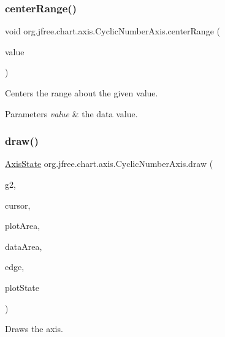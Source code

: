 \subsubsection{\texorpdfstring{center\+Range()}{centerRange()}}
{\footnotesize\ttfamily void org.\+jfree.\+chart.\+axis.\+Cyclic\+Number\+Axis.\+center\+Range (\begin{DoxyParamCaption}\item[{double}]{value }\end{DoxyParamCaption})}

Centers the range about the given value.


\begin{DoxyParams}{Parameters}
{\em value} & the data value. \\
\hline
\end{DoxyParams}
\mbox{\label{classorg_1_1jfree_1_1chart_1_1axis_1_1_cyclic_number_axis_ad760bc36b2877cd2aab98f6ad3d10787}} 
\subsubsection{\texorpdfstring{draw()}{draw()}}
{\footnotesize\ttfamily \mbox{\hyperlink{classorg_1_1jfree_1_1chart_1_1axis_1_1_axis_state}{Axis\+State}} org.\+jfree.\+chart.\+axis.\+Cyclic\+Number\+Axis.\+draw (\begin{DoxyParamCaption}\item[{Graphics2D}]{g2,  }\item[{double}]{cursor,  }\item[{Rectangle2D}]{plot\+Area,  }\item[{Rectangle2D}]{data\+Area,  }\item[{Rectangle\+Edge}]{edge,  }\item[{\mbox{\hyperlink{classorg_1_1jfree_1_1chart_1_1plot_1_1_plot_rendering_info}{Plot\+Rendering\+Info}}}]{plot\+State }\end{DoxyParamCaption})}

Draws the axis.


